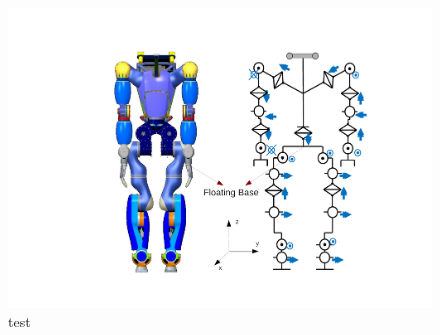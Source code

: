 
\begin{figure}
\begin{center}
\includegraphics[scale=0.75]{Bilder/TORO_kinematic.pdf}
\caption{test}
\end{center}
\end{figure}